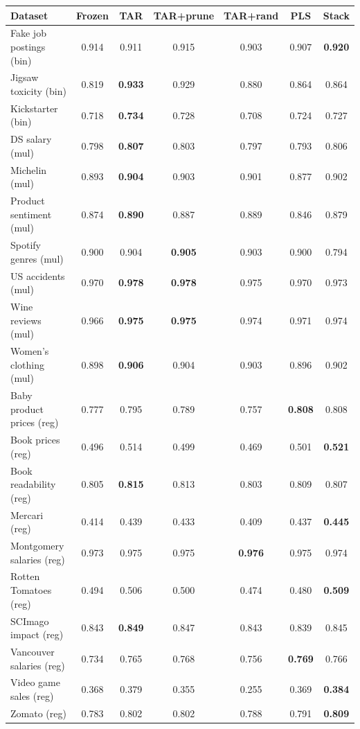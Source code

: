 \begin{tabular}{lcccccc}
\toprule
Dataset & Frozen & TAR & TAR+prune & TAR+rand & PLS & Stack \\
\midrule
Fake job postings (bin) & 0.914 & 0.911 & 0.915 & 0.903 & 0.907 & \textbf{0.920} \\
Jigsaw toxicity (bin) & 0.819 & \textbf{0.933} & 0.929 & 0.880 & 0.864 & 0.864 \\
Kickstarter (bin) & 0.718 & \textbf{0.734} & 0.728 & 0.708 & 0.724 & 0.727 \\
DS salary (mul) & 0.798 & \textbf{0.807} & 0.803 & 0.797 & 0.793 & 0.806 \\
Michelin (mul) & 0.893 & \textbf{0.904} & 0.903 & 0.901 & 0.877 & 0.902 \\
Product sentiment (mul) & 0.874 & \textbf{0.890} & 0.887 & 0.889 & 0.846 & 0.879 \\
Spotify genres (mul) & 0.900 & 0.904 & \textbf{0.905} & 0.903 & 0.900 & 0.794 \\
US accidents (mul) & 0.970 & \textbf{0.978} & \textbf{0.978} & 0.975 & 0.970 & 0.973 \\
Wine reviews (mul) & 0.966 & \textbf{0.975} & \textbf{0.975} & 0.974 & 0.971 & 0.974 \\
Women's clothing (mul) & 0.898 & \textbf{0.906} & 0.904 & 0.903 & 0.896 & 0.902 \\
Baby product prices (reg) & 0.777 & 0.795 & 0.789 & 0.757 & \textbf{0.808} & 0.808 \\
Book prices (reg) & 0.496 & 0.514 & 0.499 & 0.469 & 0.501 & \textbf{0.521} \\
Book readability (reg) & 0.805 & \textbf{0.815} & 0.813 & 0.803 & 0.809 & 0.807 \\
Mercari (reg) & 0.414 & 0.439 & 0.433 & 0.409 & 0.437 & \textbf{0.445} \\
Montgomery salaries (reg) & 0.973 & 0.975 & 0.975 & \textbf{0.976} & 0.975 & 0.974 \\
Rotten Tomatoes (reg) & 0.494 & 0.506 & 0.500 & 0.474 & 0.480 & \textbf{0.509} \\
SCImago impact (reg) & 0.843 & \textbf{0.849} & 0.847 & 0.843 & 0.839 & 0.845 \\
Vancouver salaries (reg) & 0.734 & 0.765 & 0.768 & 0.756 & \textbf{0.769} & 0.766 \\
Video game sales (reg) & 0.368 & 0.379 & 0.355 & 0.255 & 0.369 & \textbf{0.384} \\
Zomato (reg) & 0.783 & 0.802 & 0.802 & 0.788 & 0.791 & \textbf{0.809} \\
\bottomrule
\end{tabular}
